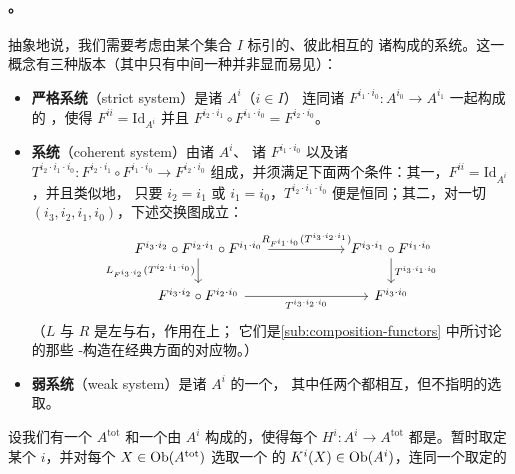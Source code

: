 \paragraph{\trWellDefinedness。}\label{sub:well-definedness}
抽象地说，我们需要考虑由某个集合 $I$ 标引的、彼此相互\trEquivalence{}的%
诸\trCategory{}构成的系统。这一概念有三种版本（其中只有中间一种并非显而易见）：
\begin{itemize}
\item \textbf{严格系统}（strict system）是诸\trCategory{} $A^i$（$i\in I$）
连同诸\trFunctor{} $F^{i_1\cdot i_0}\colon A^{i_0}\to A^{i_1}$ 一起构成的%
\trFamily，使得 $F^{ii}=\mathrm{Id}_{A^i}$ 并且
$F^{i_2\cdot i_1}\circ F^{i_1\cdot i_0}=F^{i_2\cdot i_0}$。
\item \textbf{\trCoherent{}系统}（coherent system）由诸\trCategory{} $A^i$、%
诸\trFunctor{} $F^{i_1\cdot i_0}$ 以及诸\trFunctor\trIsomorphism{}
$T^{i_2\cdot i_1\cdot i_0}\colon F^{i_2\cdot i_1}\circ F^{i_1\cdot i_0}\to F^{i_2\cdot i_0}$
组成，并须满足下面两个条件：其一，$F^{ii}=\mathrm{Id}_{A^i}$，并且类似地，%
只要 $i_2=i_1$ 或 $i_1=i_0$，$T^{i_2\cdot i_1\cdot i_0}$ 便是恒同；其二，对一切%
$(i_3,i_2,i_1,i_0)$，下述交换图成立：
\begin{equation}\label{eq:coherent-system-square}
\begin{tikzcd}[column sep=5.5em]
F^{i_3\cdot i_2}\circ F^{i_2\cdot i_1}\circ F^{i_1\cdot i_0}
  \ar[r,"{R_{F^{i_1\cdot i_0}}(T^{i_3\cdot i_2\cdot i_1})}"]
  \ar[d,"{L_{F^{i_3\cdot i_2}}(T^{i_2\cdot i_1\cdot i_0})}"']
& F^{i_3\cdot i_1}\circ F^{i_1\cdot i_0}
  \ar[d,"{T^{i_3\cdot i_1\cdot i_0}}"] \\
F^{i_3\cdot i_2}\circ F^{i_2\cdot i_0}
  \ar[r,"{T^{i_3\cdot i_2\cdot i_0}}"']
& F^{i_3\cdot i_0}
\end{tikzcd}
\end{equation}
（$L$ 与 $R$ 是左\trComposition{}与右\trComposition，作用在\trNaturalTransformation{}上；%
它们是\cref{sub:composition-functors} 中所讨论的那些 \trAinfty-构造在经典方面的对应物。）
\item \textbf{弱系统}（weak system）是诸\trCategory{} $A^i$ 的一个\trFamily，%
其中任两个都相互\trEquivalence，但不指明\trEquivalence{}的选取。
\end{itemize}
设我们有一个\trCategory{} $A^{\mathrm{tot}}$ 和一个由\trFullSubcategory{}%
$A^i$ 构成的\trFamily，使得每个\trEmbedding{} $H^i\colon A^i\to A^{\mathrm{tot}}$%
都是\trEquivalence。暂时取定某个 $i$，并对每个 $X\in\operatorname{Ob}(A^{\mathrm{tot}})$ 选取一个%
\trIsomorphic{}的\trObject{} $K^i(X)\in\operatorname{Ob}(A^i)$，连同一个取定的\trIsomorphism{}

